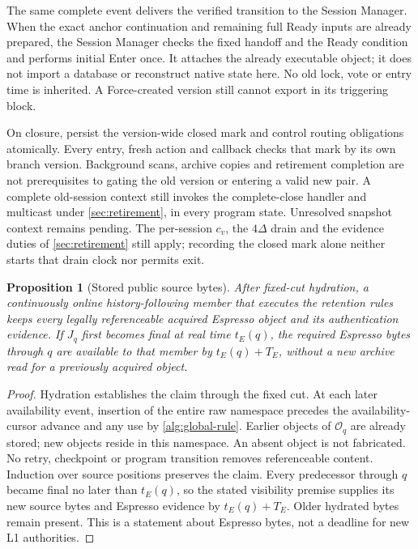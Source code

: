\documentclass[11pt,a4paper]{article}
\newtheorem{proposition}[proposition]{Proposition}
\begin{document}
The same complete event delivers the verified transition to the Session
Manager. When the exact anchor continuation and remaining full Ready
inputs are already prepared, the Session Manager checks the fixed handoff and
the Ready condition and performs initial Enter once. It
attaches the already executable object; it does not import a database
or reconstruct native state here. No old lock, vote or entry time is
inherited. A Force-created version still cannot export in its triggering
block.

On closure, persist the version-wide closed mark and control
routing obligations atomically. Every entry, fresh action and callback
checks that mark by its own branch version. Background scans, archive copies and
retirement completion are not prerequisites to gating the old version
or entering a valid new pair. A complete old-session context still
invokes the complete-close handler and multicast under
\cref{sec:retirement}, in every program state.
Unresolved snapshot context remains pending. The per-session
$c_v$, the $4\Delta$ drain and the evidence duties of \cref{sec:retirement} still apply; recording
the closed mark alone neither starts that drain clock nor permits exit.

\begin{proposition}[Stored public source bytes]
\label{prop:retained-public-bytes}
After fixed-cut hydration, a continuously online history-following
member that executes the retention rules keeps every legally
referenceable acquired Espresso object and its authentication evidence.
If $J_q$ first becomes final at real time $t_E(q)$, the required
Espresso bytes through $q$ are available to that member by $t_E(q)+T_E$, without a
new archive read for a previously acquired object.
\end{proposition}
\begin{proof}
Hydration establishes the claim through the fixed cut. At each later
availability event, insertion of the entire raw namespace precedes the
availability-cursor advance and any use by \cref{alg:global-rule}.
Earlier objects of $\mathcal O_q$ are already stored; new objects reside
in this namespace. An absent
object is not fabricated. No retry, checkpoint or program transition
removes referenceable content. Induction over source positions preserves
the claim. Every predecessor through $q$ became final no later than $t_E(q)$,
so the stated visibility premise supplies its new source bytes and
Espresso evidence by $t_E(q)+T_E$. Older hydrated bytes remain present.
This is a statement about Espresso bytes, not a deadline for new L1 authorities.
\end{proof}
\end{document}
